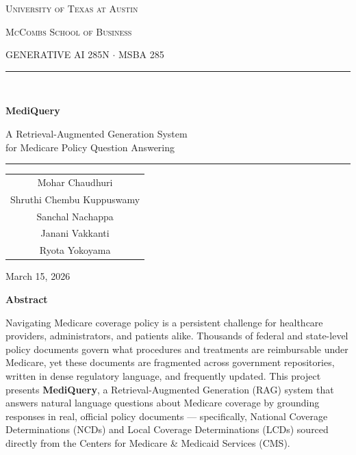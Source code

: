 \documentclass[10pt, letterpaper]{article}
\begin{document}
\begin{titlepage}
    \centering
    \vspace*{2cm}

    {\large \textsc{University of Texas at Austin} \par}
    {\large \textsc{McCombs School of Business} \par}
    {\large GENERATIVE AI 285N $\cdot$ MSBA 285 \par}

    \vspace{1.5cm}
    \rule{\linewidth}{0.6pt}\\[0.4cm]

    {\LARGE \textbf{MediQuery} \par}
    \vspace{0.3cm}
    {\large A Retrieval-Augmented Generation System\\[4pt]
    for Medicare Policy Question Answering \par}

    \rule{\linewidth}{0.6pt}

    \vspace{2cm}

    {\normalsize
    \begin{tabular}{c}
        Mohar Chaudhuri \\[4pt]
        Shruthi Chembu Kuppuswamy\\[4pt]
        Sanchal Nachappa\\[4pt]
        Janani Vakkanti\\[4pt]
        Ryota Yokoyama
    \end{tabular}
    \par}

    \vfill

    {\normalsize March 15, 2026 \par}
    \vspace{0.5cm}
\end{titlepage}

\newpage
\thispagestyle{fancy}

\begin{center}
    {\large \textbf{Abstract}}
\end{center}

\vspace{0.3cm}

\noindent
Navigating Medicare coverage policy is a persistent challenge for healthcare providers,
administrators, and patients alike. Thousands of federal and state-level policy documents
govern what procedures and treatments are reimbursable under Medicare, yet these documents
are fragmented across government repositories, written in dense regulatory language, and
frequently updated. This project presents \textbf{MediQuery}, a Retrieval-Augmented Generation
(RAG) system that answers natural language questions about Medicare coverage by grounding
responses in real, official policy documents --- specifically, National Coverage Determinations
(NCDs) and Local Coverage Determinations (LCDs) sourced directly from the Centers for
Medicare \& Medicaid Services (CMS).
\end{document}
